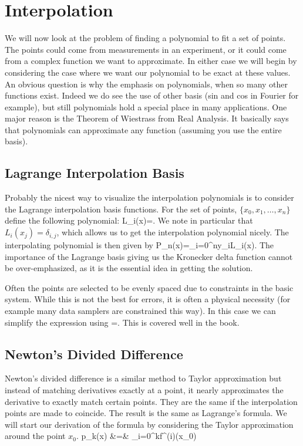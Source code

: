 \chapter{Interpolation}\label{c-IntApp}

We will now look at the problem of finding a polynomial to fit a set
of points.  The points could come from measurements in an experiment,
or it could come from a complex function we want to approximate.  In
either case we will begin by considering the case where we want our
polynomial to be exact at these values.  An obvious question is why
the emphasis on polynomials, when so many other functions exist.
Indeed we do see the use of other basis (sin and cos in Fourier for
example), but still polynomials hold a special place in many
applications.  One major reason is the Theorem of Wiestrass from Real
Analysis.  It basically says that polynomials can approximate any
function (assuming you use the entire basis).

\section{Lagrange Interpolation Basis}
Probably the nicest way to visualize the interpolation polynomials is
to consider the Lagrange interpolation basis functions.  For the set
of points, $\{x_{0}, x_{1}, \ldots, x_{n}\}$ define the following polynomial:
\beqn
L_{i}(x)=.
\eeqn
We note in particular that $L_{i}(x_{j})=\delta_{i,j}$, which allows
us to get the interpolation polynomial nicely.  The interpolating polynomial
is then given by
\beqn
P_{n}(x)=\sum_{i=0}^{n}y_{i}L_{i}(x).
\eeqn
The importance of the Lagrange basis giving us the Kronecker delta
function cannot be over-emphasized, as it is the essential idea in
getting the solution.

Often the points are selected to be evenly spaced due to constraints
in the basic system.  While this is not the best for errors, it is
often a physical necessity (for example many data samplers are
constrained this way).  In this case we can simplify the expression
using
\beqn
\mu=.
\eeqn
This is covered well in the book.

\section{Newton's Divided Difference}
Newton's divided difference is a similar method to Taylor approximation but
instead of matching derivatives exactly at a point, it nearly
approximates the derivative to exactly match certain points.  They are the same if the interpolation points are made to coincide.  The result is the same as Lagrange's formula.  We will start our derivation of the formula by considering the Taylor approximation around the point $x_0$.
\beqn
p_k(x) &=& \sum_{i=0}^{k}f^{(i)}(x_0)
\eeqn

